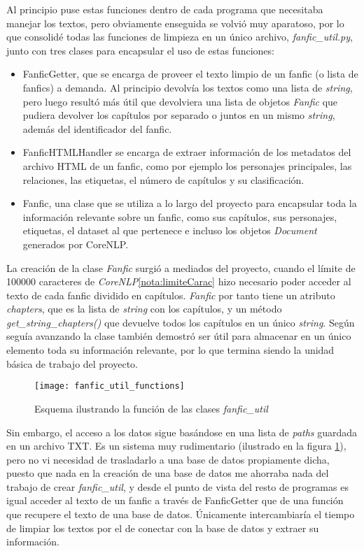 \documentclass{pre-tfg}
\begin{document}
Al principio puse estas funciones dentro de cada programa que necesitaba manejar los textos, pero obviamente enseguida se volvió muy aparatoso, por lo que consolidé todas las funciones de limpieza en un único archivo, \textit{fanfic\_util.py}, junto con tres clases para encapsular el uso de estas funciones:

\begin{itemize}
	\item FanficGetter, que se encarga de proveer el texto limpio de un fanfic (o lista de fanfics) a demanda. Al principio devolvía los textos como una lista de \textit{string}, pero luego resultó más útil que devolviera una lista de objetos \textit{Fanfic} que pudiera devolver los capítulos por separado o juntos en un mismo \textit{string}, además del identificador del fanfic.
	\item FanficHTMLHandler se encarga de extraer información de los metadatos del archivo HTML de un fanfic, como por ejemplo los personajes principales, las relaciones, las etiquetas, el número de capítulos y su clasificación.
	\item Fanfic, una clase que se utiliza a lo largo del proyecto para encapsular toda la información relevante sobre un fanfic, como sus capítulos, sus personajes, etiquetas, el dataset al que pertenece e incluso los objetos \textit{Document} generados por CoreNLP.
\end{itemize}

La creación de la clase \textit{Fanfic} surgió a mediados del proyecto, cuando el límite de 100000 caracteres de \textit{CoreNLP}\ref{nota:limiteCarac} hizo necesario poder acceder al texto de cada fanfic dividido en capítulos. \textit{Fanfic} por tanto tiene un atributo \textit{chapters}, que es la lista de \textit{string} con los capítulos, y un método \textit{get\_string\_chapters()} que devuelve todos los capítulos en un único \textit{string}. Según seguía avanzando la clase también demostró ser útil para almacenar en un único elemento toda su información relevante, por lo que termina siendo la unidad básica de trabajo del proyecto.

\begin{figure}[h]
	\centering
	\texttt{[image: fanfic\_util\_functions]}
	\caption{Esquema ilustrando la función de las clases \textit{fanfic\_util}}
	\label{fig:fanfic_util}
\end{figure}

Sin embargo, el acceso a los datos sigue basándose en una lista de \textit{paths} guardada en un archivo TXT. Es un sistema muy rudimentario (ilustrado en la figura \ref{fig:fanfic_util}), pero no vi necesidad de trasladarlo a una base de datos propiamente dicha, puesto que nada en la creación de una base de datos me ahorraba nada del trabajo de crear \textit{fanfic\_util}, y desde el punto de vista del resto de programas es igual acceder al texto de un fanfic a través de FanficGetter que de una función que recupere el texto de una base de datos. Únicamente intercambiaría el tiempo de limpiar los textos por el de conectar con la base de datos y extraer su información.
\end{document}
